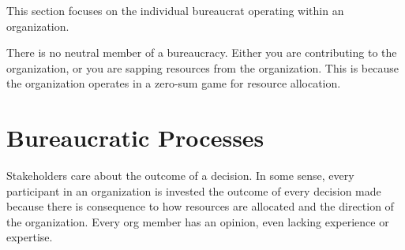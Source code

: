 \documentclass{book}
\begin{document}
    This section focuses on the individual bureaucrat operating within an organization. 
    
    There is no neutral member of a bureaucracy. Either you are contributing to the organization, or you are sapping resources from the organization. This is because the organization operates in a zero-sum game for resource allocation.
    
    
    
  \newpage
    
    
    
    
    
    
  \newpage
  \section{Bureaucratic Processes\label{sec:process}}
    
    
    
    
    
    
    
    
    
  \newpage

    
    
    
    

    Stakeholders care about the outcome of a decision. 
    In some sense, every participant in an organization is invested the outcome of every decision made because there is consequence to how resources are allocated and the direction of the organization. Every org member has an opinion, even lacking experience or expertise. 
    
    
    
%    
    
\end{document}
